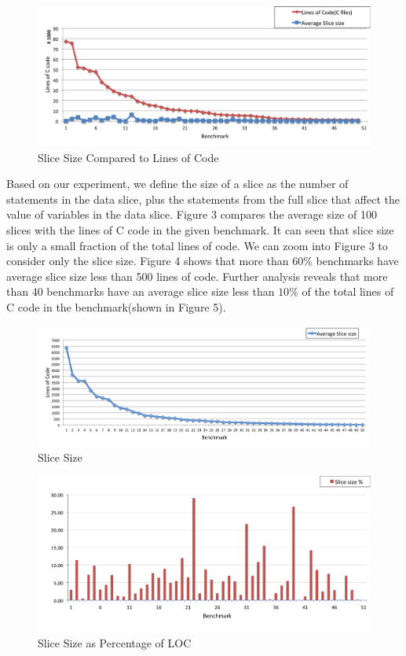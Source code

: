 \documentclass[12pt]{article}
\begin{document}
\begin{figure}[H]
     \centering
     \includegraphics[width=5in]{slice-size-compare.png}
     \caption{Slice Size Compared to Lines of Code}
     \label{slice size comparison}
 \end{figure}

Based on our experiment, we define the size of a slice as the number of statements in the data slice, plus the statements from the full slice that affect the value of variables in the data slice. Figure 3 compares the average size of 100 slices with the lines of C code in the given benchmark. It can seen that slice size is only a small fraction of the total lines of code. We can zoom into Figure 3 to consider only the slice size. Figure 4 shows that  more than $60\%$ benchmarks have average slice size less than 500 lines of code. Further analysis reveals that more than 40 benchmarks have an average slice size less than $10\%$ of the total lines of C code in the benchmark(shown in Figure 5).\\

\begin{figure}[H]
     \centering
     \includegraphics[width=5in]{slice-size-dec.png}
     \caption{Slice Size}
     \label{slice size distribution}
 \end{figure}
 
\begin{figure}[H]
     \centering
     \includegraphics[width=5in]{slice-size-percent.png}
     \caption{Slice Size as Percentage of LOC}
     \label{slice size comparison}
 \end{figure}
\end{document}
